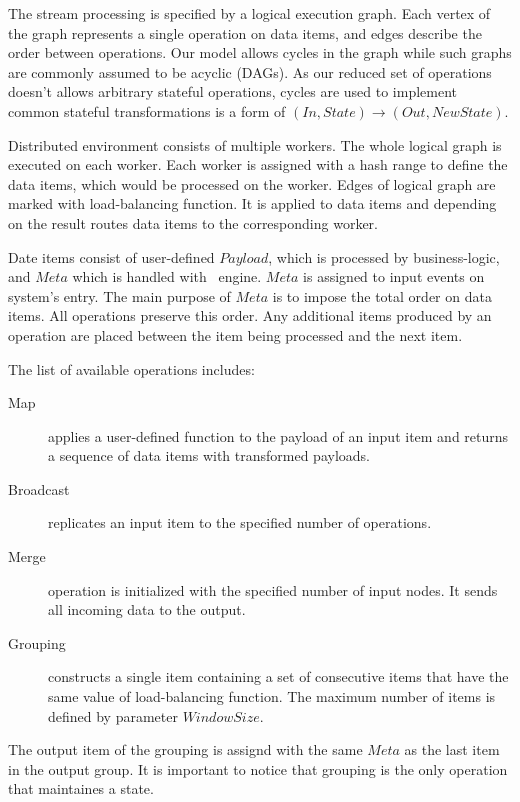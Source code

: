 \label {fs-short-model}

The stream processing is specified by a logical execution graph. Each vertex of the graph represents a single operation on data items, and edges describe the order between operations. Our model allows cycles in the graph while such graphs are commonly assumed to be acyclic (DAGs). As our reduced set of operations doesn't allows arbitrary stateful operations, cycles are used to implement common stateful transformations is a form of $(In, State) \rightarrow (Out, NewState)$.

Distributed environment consists of multiple workers. The whole logical graph is executed on each worker. Each worker is assigned with a hash range to define the data items, which would be processed on the worker. Edges of logical graph are marked with load-balancing function. It is applied to data items and depending on the result routes data items to the corresponding worker.

Date items consist of user-defined $Payload$, which is processed by business-logic, and $Meta$ which is handled with \FlameStream\ engine. $Meta$ is assigned to input events on system's entry. The main purpose of $Meta$ is to impose the total order on data items. All operations preserve this order. Any additional items produced by an operation are placed between the item being processed and the next item.

The list of available operations includes:

\begin {description}
  \item [Map] applies a user-defined function to the payload of an input item and returns a sequence of data items with transformed payloads. 
  \item [Broadcast] replicates an input item to the specified number of operations.
  \item [Merge] operation is initialized with the specified number of input nodes. It sends all incoming data to the output.
  \item [Grouping] constructs a single item containing a set of consecutive items that have the same value of load-balancing function. The maximum number of items is defined by parameter $Window Size$. 
\end {description}

The output item of the grouping is assignd with the same $Meta$ as the last item in the output group. It is important to notice that grouping is the only operation that maintaines a state.

